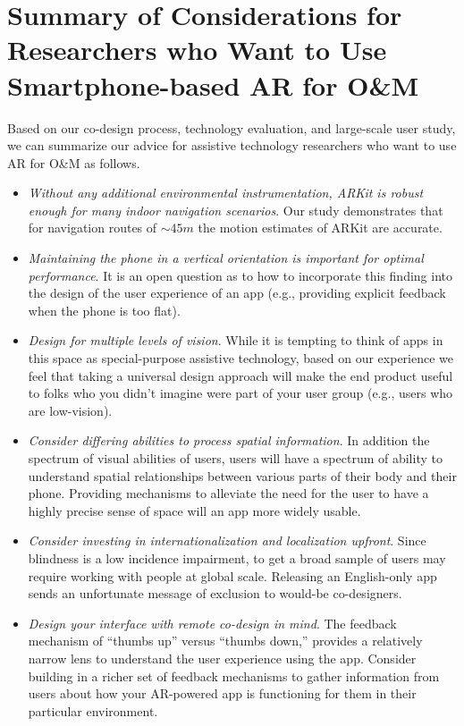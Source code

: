 \documentclass[chi_draft]{sigchi}
\newcommand{\OM}{O\&M\xspace}
\begin{document}
\section{Summary of Considerations for Researchers who Want to Use Smartphone-based AR for \OM}

Based on our co-design process, technology evaluation, and large-scale user study, we can summarize our advice for assistive technology researchers who want to use AR for \OM as follows.

\begin{itemize}
\item \emph{Without any additional environmental instrumentation, ARKit is robust enough for many indoor navigation scenarios}.  Our study demonstrates that for navigation routes of $\sim45m$ the motion estimates of ARKit are accurate.
\item \emph{Maintaining the phone in a vertical orientation is important for optimal performance}.  It is an open question as to how to incorporate this finding into the design of the user experience of an app (e.g., providing explicit feedback when the phone is too flat).
\item \emph{Design for multiple levels of vision}.  While it is tempting to think of apps in this space as special-purpose assistive technology, based on our experience we feel that taking a universal design approach will make the end product useful to folks who you didn't imagine were part of your user group (e.g., users who are low-vision).
\item \emph{Consider differing abilities to process spatial information}.  In addition the spectrum of visual abilities of users, users will have a spectrum of ability to understand spatial relationships between various parts of their body and their phone.  Providing mechanisms to alleviate the need for the user to have a highly precise sense of space will an app more widely usable.
\item \emph{Consider investing in internationalization and localization upfront}.  Since blindness is a low incidence impairment, to get a broad sample of users may require working with people at global scale.  Releasing an English-only app sends an unfortunate message of exclusion to would-be co-designers.

\item \emph{Design your interface with remote co-design in mind}.  The feedback mechanism of ``thumbs up'' versus ``thumbs down,'' provides a relatively narrow lens to understand the user experience using the app.  Consider building in a richer set of feedback mechanisms to gather information from users about how your AR-powered app is functioning for them in their particular environment.


\end{itemize}
\end{document}
